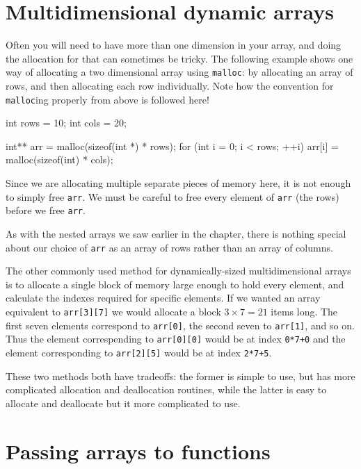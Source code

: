 \section{Multidimensional dynamic arrays}

Often you will need to have more than one dimension in your array, and doing the allocation for that can sometimes be tricky.
The following example shows one way of allocating a two dimensional array using \texttt{malloc}: by allocating an array of rows, and then allocating each row individually.
Note how the convention for \lstinline!malloc!ing properly from above is followed here! 

\begin{codeblock}
int rows = 10;
int cols = 20;

int** arr = malloc(sizeof(int *) * rows);
for (int i = 0; i < rows; ++i) {
    arr[i] = malloc(sizeof(int) * cols);
}
\end{codeblock}

Since we are allocating multiple separate pieces of memory here, it is not enough to simply free \lstinline!arr!.
We must be careful to free every element of \lstinline!arr! (the rows) before we free \lstinline!arr!.

As with the nested arrays we saw earlier in the chapter, there is nothing special about our choice of \lstinline!arr! as an array of rows rather than an array of columns.

The other commonly used method for dynamically-sized multidimensional arrays is to allocate a single block of memory large enough to hold every element, and calculate the indexes required for specific elements.
If we wanted an array equivalent to \lstinline!arr[3][7]! we would allocate a block $3 \times 7 = 21$ items long.
The first seven elements correspond to \lstinline!arr[0]!, the second seven to \lstinline!arr[1]!, and so on.
Thus the element correspending to \lstinline!arr[0][0]! would be at index \lstinline!0*7+0! and the element corresponding to \lstinline!arr[2][5]! would be at index \lstinline!2*7+5!.

These two methods both have tradeoffs: the former is simple to use, but has more complicated allocation and deallocation routines, while the latter is easy to allocate and deallocate but it more complicated to use.

\section{Passing arrays to functions}


